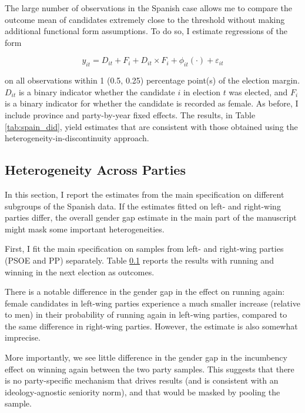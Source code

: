 \documentclass[12pt]{article}
\begin{document}
The large number of observations in the Spanish case allows me to compare the outcome mean of candidates extremely close to the threshold without making additional functional form assumptions. To do so, I estimate regressions of the form

\begin{equation}
    y_{it} = D_{it} + F_{i} + D_{it} \times F_{i} + \phi_{it}(\cdot) + \varepsilon_{it}
\end{equation}

on all observations within 1 (0.5, 0.25) percentage point(s) of the election margin. $D_{it}$ is a binary indicator whether the candidate $i$ in election $t$ was elected, and $F_i$ is a binary indicator for whether the candidate is recorded as female. As before, I include province and party-by-year fixed effects. The results, in Table \ref{tab:spain_did}, yield estimates that are consistent with those obtained using the heterogeneity-in-discontinuity approach.





\clearpage

\subsection{Heterogeneity Across Parties}
\label{app:spain_by_party}

In this section, I report the estimates from the main specification on different subgroups of the Spanish data. If the estimates fitted on left- and right-wing parties differ, the overall gender gap estimate in the main part of the manuscript might mask some important heterogeneities.

First, I fit the main specification on samples from left- and right-wing parties (PSOE and PP) separately. Table \ref{app:spain_by_party} reports the results with running and winning in the next election as outcomes.

There is a notable difference in the gender gap in the effect on running again: female candidates in left-wing parties experience a much smaller increase (relative to men) in their probability of running again in left-wing parties, compared to the same difference in right-wing parties. However, the estimate is also somewhat imprecise.

More importantly, we see little difference in the gender gap in the incumbency effect on winning again between the two party samples. This suggests that there is no party-specific mechanism that drives results (and is consistent with an ideology-agnostic seniority norm), and that would be masked by pooling the sample.
\end{document}
